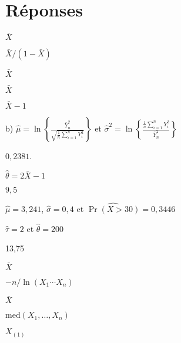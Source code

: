 \bigskip
\section*{Réponses}

\begin{reponse}{4.1}
    \begin{inparaenum}
    \item $\bar{X}$
    \item $\bar{X}/(1 - \bar{X})$
    \item $\bar{X}$
    \item $\bar{X}$
    \item $\bar{X} - 1$
    \end{inparaenum}
  
\end{reponse}
\begin{reponse}{4.2}
b) $\hat \mu = \ln\left\{\frac{\bar Y_n^2}{\sqrt{\frac{1}{n}\sum_{i=1}^n Y_i^2}} \right\}$ et $\hat\sigma^2 = \ln\left\{\frac{\frac{1}{n}\sum_{i=1}^n Y_i^2}{\bar Y_n^2} \right\}$
\end{reponse}
\begin{reponse}{4.3}
    $0,2381$.
  
\end{reponse}
\begin{reponse}{4.4}
    \begin{inparaenum}
    \item $\hat{\theta} = 2 \bar{X} - 1$
    \item $9,5$
    \end{inparaenum}
  
\end{reponse}
\begin{reponse}{4.5}
$\hat{\mu}=3,241$, $\hat{\sigma}=0,4$ et $\widehat{\Pr(X>30)}= 0,3446$
\end{reponse}
\begin{reponse}{4.6}
$\hat{\tau}=2$ et $\hat{\theta}=200$
\end{reponse}
\begin{reponse}{4.7}
13,75
\end{reponse}
\begin{reponse}{4.8}
    \begin{inparaenum}
    \item $\bar{X}$
    \item $-n/\ln(X_1 \cdots X_n)$
    \item $\bar{X}$
    \item $\text{med}(X_1, \dots, X_n)$
    \item $X_{(1)}$
    \end{inparaenum}
  
\end{reponse}
